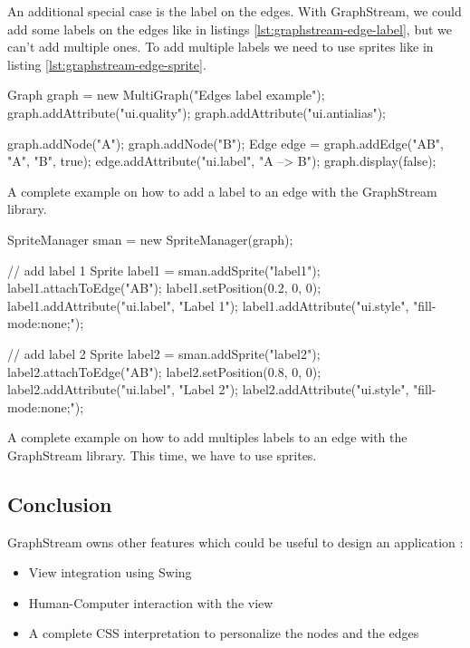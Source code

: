 An additional special case is the label on the edges. With GraphStream, we could
add some labels on the edges like in listings \ref{lst:graphstream-edge-label},
but we can't add multiple ones. To add multiple labels we need to use sprites like
in listing \ref{lst:graphstream-edge-sprite}.

\begin{listing}[H]
  \centering
  \begin{javacode}
  Graph graph = new MultiGraph("Edges label example");
  graph.addAttribute("ui.quality");
  graph.addAttribute("ui.antialias");
  
  graph.addNode("A");
  graph.addNode("B");
  Edge edge = graph.addEdge("AB", "A", "B", true);
  edge.addAttribute("ui.label", "A --> B");
  graph.display(false);
  \end{javacode}
  \caption[Add a label on an edge with GraphStream]{A complete example on how to
add a label to an edge with the GraphStream library.}
  \label{lst:graphstream-edge-label}
\end{listing}

\begin{listing}[H]
  \centering
  \begin{javacode}
    SpriteManager sman = new SpriteManager(graph);

    // add label 1
    Sprite label1 = sman.addSprite("label1");
    label1.attachToEdge("AB");
    label1.setPosition(0.2, 0, 0);
    label1.addAttribute("ui.label", "Label 1");
    label1.addAttribute("ui.style", "fill-mode:none;");

    // add label 2
    Sprite label2 = sman.addSprite("label2");
    label2.attachToEdge("AB");
    label2.setPosition(0.8, 0, 0);
    label2.addAttribute("ui.label", "Label 2");
    label2.addAttribute("ui.style", "fill-mode:none;");
  \end{javacode}
  \caption[Add two label on an edge with GraphStream]{A complete example on how
to add multiples labels to an edge with the GraphStream library. This time, we
have to use sprites.}
  \label{lst:graphstream-edge-sprite}
\end{listing}

\subsection{Conclusion}
\label{sub:Conclusion-gs}

GraphStream owns other features which could be useful to design an application :
\begin{itemize}
\item View integration using Swing
\item Human-Computer interaction with the view
\item A complete CSS interpretation to personalize the nodes and the edges
\end{itemize}

